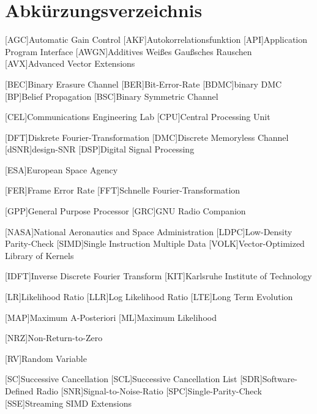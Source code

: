 \chapter{Abkürzungsverzeichnis}
\begin{acronym}[TROLL]
  [AGC]{Automatic Gain Control}
  [AKF]{Autokorrelationsfunktion}
  [API]{Application Program Interface}
  [AWGN]{Additives Weißes Gaußsches Rauschen}
  [AVX]{Advanced Vector Extensions}
  
  [BEC]{Binary Erasure Channel}
  [BER]{Bit-Error-Rate}
  [BDMC]{binary \acs{DMC}}
  [BP]{Belief Propagation}
  [BSC]{Binary Symmetric Channel}
  
  [CEL]{Communications Engineering Lab}
  [CPU]{Central Processing Unit}

  [DFT]{Diskrete Fourier-Transformation}
  [DMC]{Discrete Memoryless Channel}
  [dSNR]{design-\ac{SNR}}
  [DSP]{Digital Signal Processing}
 
  [ESA]{European Space Agency}

  [FER]{Frame Error Rate}
  [FFT]{Schnelle Fourier-Transformation}
  
  [GPP]{General Purpose Processor}
  [GRC]{GNU Radio Companion}
  
  [NASA]{National Aeronautics and Space Administration}
  [LDPC]{Low-Density Parity-Check}
  [SIMD]{Single Instruction Multiple Data}
  [VOLK]{Vector-Optimized Library of Kernels}

  [IDFT]{Inverse Discrete Fourier Transform}
  [KIT]{Karlsruhe Institute of Technology}

  [LR]{Likelihood Ratio}
  [LLR]{Log Likelihood Ratio}
  [LTE]{Long Term Evolution}
 
  [MAP]{Maximum A-Posteriori}
  [ML]{Maximum Likelihood}
 
  [NRZ]{Non-Return-to-Zero}
 
  [RV]{Random Variable}
 
  [SC]{Successive Cancellation}
  [SCL]{Successive Cancellation List}
  [SDR]{Software-Defined Radio}
  [SNR]{Signal-to-Noise-Ratio}
  [SPC]{Single-Parity-Check}
  [SSE]{Streaming SIMD Extensions}


\end{acronym}
